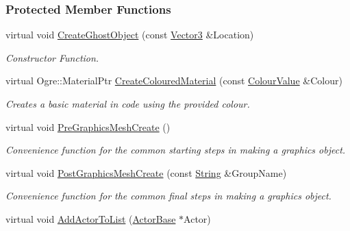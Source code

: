 \subsubsection*{Protected Member Functions}
\begin{DoxyCompactItemize}
\item 
virtual void \hyperlink{classphys_1_1AreaEffect_a6c31aa396851e4e17de53d9e83e2f8ee}{CreateGhostObject} (const \hyperlink{classphys_1_1Vector3}{Vector3} \&Location)
\begin{DoxyCompactList}\small\item\em Constructor Function. \item\end{DoxyCompactList}\item 
\hypertarget{classphys_1_1AreaEffect_aef2925aaa94dffb2b4d3755cfe41cb7d}{
virtual Ogre::MaterialPtr \hyperlink{classphys_1_1AreaEffect_aef2925aaa94dffb2b4d3755cfe41cb7d}{CreateColouredMaterial} (const \hyperlink{classphys_1_1ColourValue}{ColourValue} \&Colour)}
\label{classphys_1_1AreaEffect_aef2925aaa94dffb2b4d3755cfe41cb7d}

\begin{DoxyCompactList}\small\item\em Creates a basic material in code using the provided colour. \item\end{DoxyCompactList}\item 
\hypertarget{classphys_1_1AreaEffect_a923efe92684ce71e138ad182b356b9c0}{
virtual void \hyperlink{classphys_1_1AreaEffect_a923efe92684ce71e138ad182b356b9c0}{PreGraphicsMeshCreate} ()}
\label{classphys_1_1AreaEffect_a923efe92684ce71e138ad182b356b9c0}

\begin{DoxyCompactList}\small\item\em Convenience function for the common starting steps in making a graphics object. \item\end{DoxyCompactList}\item 
\hypertarget{classphys_1_1AreaEffect_ad301f97450bd17deeb66ccef9bc61647}{
virtual void \hyperlink{classphys_1_1AreaEffect_ad301f97450bd17deeb66ccef9bc61647}{PostGraphicsMeshCreate} (const \hyperlink{namespacephys_aa03900411993de7fbfec4789bc1d392e}{String} \&GroupName)}
\label{classphys_1_1AreaEffect_ad301f97450bd17deeb66ccef9bc61647}

\begin{DoxyCompactList}\small\item\em Convenience function for the common final steps in making a graphics object. \item\end{DoxyCompactList}\item 
\hypertarget{classphys_1_1AreaEffect_a7af039b84f8d55e2c1c2d5a1b57afd8a}{
virtual void \hyperlink{classphys_1_1AreaEffect_a7af039b84f8d55e2c1c2d5a1b57afd8a}{AddActorToList} (\hyperlink{classphys_1_1ActorBase}{ActorBase} $\ast$Actor)}
\label{classphys_1_1AreaEffect_a7af039b84f8d55e2c1c2d5a1b57afd8a}


\end{DoxyCompactItemize}

